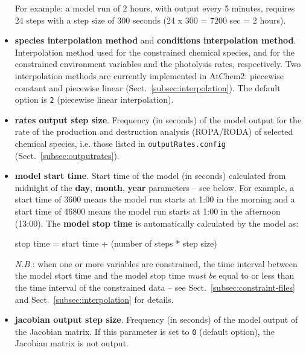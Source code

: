 \begin{itemize}
  For example: a model run of 2 hours, with output every 5 minutes,
  requires 24 steps with a step size of 300 seconds (24 x 300 = 7200
  sec = 2 hours).
\item \textbf{species interpolation method} and
  \textbf{conditions interpolation method}. Interpolation method used
  for the constrained chemical species, and for the constrained
  environment variables and the photolysis rates, respectively. Two
  interpolation methods are currently implemented in AtChem2:
  piecewise constant and piecewise linear (Sect.~\ref{subsec:interpolation}).
  The default option is \texttt{2} (piecewise linear interpolation).
\item \textbf{rates output step size}. Frequency (in seconds) of the
  model output for the rate of the production and destruction analysis
  (ROPA/RODA) of selected chemical species, i.e. those listed in
  \texttt{outputRates.config} (Sect.~\ref{subsec:outputrates}).
\item \textbf{model start time}. Start time of the model (in seconds)
  calculated from midnight of the \textbf{day}, \textbf{month},
  \textbf{year} parameters -- see below. For example, a start time of
  3600 means the model run starts at 1:00 in the morning and a start
  time of 46800 means the model run starts at 1:00 in the afternoon
  (13:00). The \textbf{model stop time} is automatically calculated by
  the model as:
  \begin{center}
  stop time = start time + (number of steps * step size)
  \end{center}
  \emph{N.B.}: when one or more variables are constrained, the time
  interval between the model start time and the model stop time
  \emph{must be} equal to or less than the time interval of the
  constrained data -- see Sect.~\ref{subsec:constraint-files} and
  Sect.~\ref{subsec:interpolation} for details.
\item \textbf{jacobian output step size}. Frequency (in seconds) of
  the model output of the Jacobian matrix. If this parameter is set to
  \texttt{0} (default option), the Jacobian matrix is not output.


\end{itemize}
